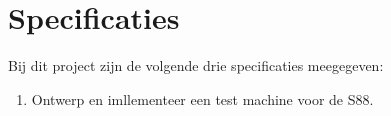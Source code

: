 \chapter{Specificaties}
	Bij dit project zijn de volgende drie specificaties meegegeven:
	\begin{enumerate}
		\item Ontwerp en imllementeer een test machine voor de S88.
	\end{enumerate}
